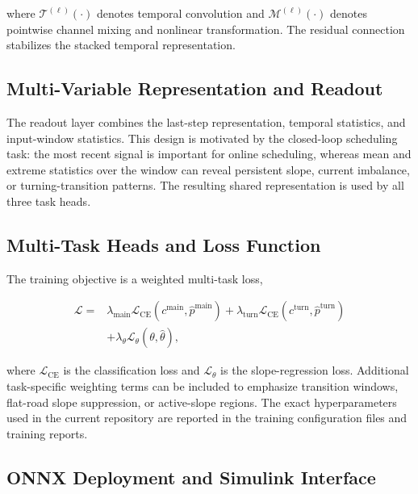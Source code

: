 \documentclass[twocolumn]{article}
\begin{document}
where $\mathcal{T}^{(\ell)}(\cdot)$ denotes temporal convolution and $\mathcal{M}^{(\ell)}(\cdot)$ denotes pointwise channel mixing and nonlinear transformation. The residual connection stabilizes the stacked temporal representation.

\subsection{Multi-Variable Representation and Readout}

The readout layer combines the last-step representation, temporal statistics, and input-window statistics. This design is motivated by the closed-loop scheduling task: the most recent signal is important for online scheduling, whereas mean and extreme statistics over the window can reveal persistent slope, current imbalance, or turning-transition patterns. The resulting shared representation is used by all three task heads.

\subsection{Multi-Task Heads and Loss Function}

The training objective is a weighted multi-task loss,

\begin{equation}
\begin{aligned}
\mathcal{L}
=
&\lambda_{\mathrm{main}}
\mathcal{L}_{\mathrm{CE}}
\left(
c^{\mathrm{main}},
\hat{p}^{\mathrm{main}}
\right)
+
\lambda_{\mathrm{turn}}
\mathcal{L}_{\mathrm{CE}}
\left(
c^{\mathrm{turn}},
\hat{p}^{\mathrm{turn}}
\right)\\
&+
\lambda_{\theta}
\mathcal{L}_{\theta}
\left(
\theta,
\hat{\theta}
\right),
\end{aligned}
\label{eq:multi_task_loss}
\end{equation}

where $\mathcal{L}_{\mathrm{CE}}$ is the classification loss and $\mathcal{L}_{\theta}$ is the slope-regression loss. Additional task-specific weighting terms can be included to emphasize transition windows, flat-road slope suppression, or active-slope regions. The exact hyperparameters used in the current repository are reported in the training configuration files and training reports.

\subsection{ONNX Deployment and Simulink Interface}
\end{document}
